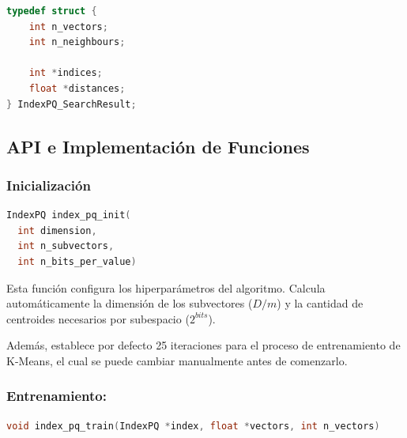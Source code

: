 \newpage

\begin{lstlisting}[language=C, caption=Estructura IndexPQ SearchResult]
typedef struct {
    int n_vectors;
    int n_neighbours;

    int *indices;
    float *distances;
} IndexPQ_SearchResult;
\end{lstlisting}

\newpage

\subsection{API e Implementaci\'on de Funciones}

\subsubsection{Inicializaci\'on}

\begin{lstlisting}[language=C, caption=Inicializaci\'on]
IndexPQ index_pq_init(
  int dimension,
  int n_subvectors,
  int n_bits_per_value)
\end{lstlisting}

Esta funci\'on configura los hiperpar\'ametros del algoritmo.
Calcula autom\'aticamente la dimensi\'on de los subvectores ($D/m$)
y la cantidad de centroides necesarios por subespacio ($2^{bits}$).

Adem\'as, establece por defecto 25 iteraciones para el proceso de entrenamiento
de K-Means, el cual se puede cambiar manualmente antes de comenzarlo.

\subsubsection{Entrenamiento:}

\begin{lstlisting}[language=C, caption=Entrenamiento]
void index_pq_train(IndexPQ *index, float *vectors, int n_vectors)
\end{lstlisting}

